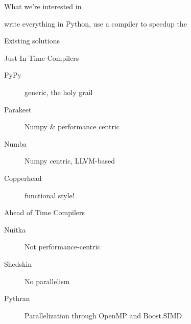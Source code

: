 \documentclass[serif]{beamer} %
\begin{document}
\begin{frame}{What we're interested in}
  \begin{center}

   write everything in Python, use a compiler to speedup the \color{blue}{hotspot}\end{center}
\end{frame}

\begin{frame}[allowframebreaks=.9]{Existing solutions}
    \begin{block}{Just In Time Compilers}
        \begin{description}
            \item[PyPy] generic, the holy grail
            \item[Parakeet] Numpy \& performance centric
            \item[Numba] Numpy centric, LLVM-based
            \item[Copperhead] functional style!
        \end{description}
    \end{block}

    \begin{block}{Ahead of Time Compilers}
        \begin{description}
            \item[Nuitka] Not performance-centric
            \item[Shedskin] No parallelism
            \item[Pythran] Parallelization through OpenMP and Boost.SIMD
        \end{description}
    \end{block}

\end{frame}
\end{document}
